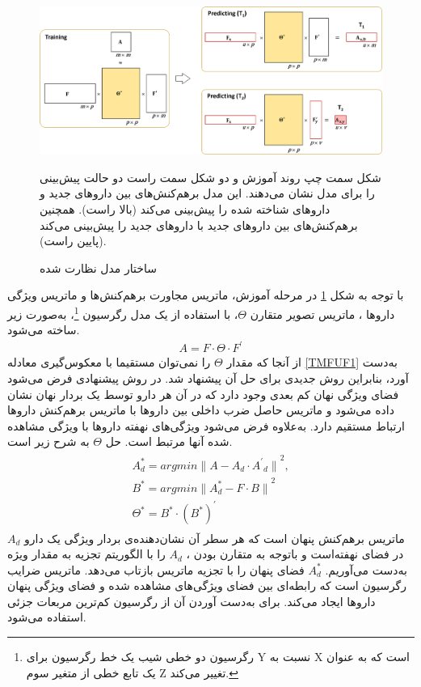\begin{figure}[!h]
\centering
\includegraphics[scale=.3]{section2/TMFUFmodel.png}
	\caption{
ساختار مدل نظارت شده 
\cite{Shi J-Y2018}}
\begin{flushright}
شکل سمت چپ روند آموزش و دو شکل سمت راست دو حالت پیش‌بینی را برای مدل
نشان می‌دهند. این مدل برهم‌کنش‌های بین داروهای جدید و داروهای شناخته شده را پیش‌بینی می‌کند (بالا راست). همچنین برهم‌کنش‌های بین داروهای جدید با داروهای جدید را پیش‌بینی می‌کند (پایین راست).
\end{flushright}

\label{TMFUFmodel}
\end{figure}
با توجه به شکل 
\ref{TMFUFmodel}
در مرحله آموزش، ماتریس مجاورت برهم‌کنش‌ها
و ماتریس ویژگی داروها
،
ماتریس تصویر متقارن
$\Theta$،
با استفاده از یک مدل رگرسیون 
\footnote{رگرسیون دو خطی شیب یک خط رگرسیون برای Y نسبت به X است که به عنوان یک تابع خطی از متغیر سوم Z تغییر می‌کند.}،
به‌صورت زیر ساخته می‌شود.
\begin{equation}
\begin{aligned}
A = F\cdot\Theta\cdot{F^\prime}
\label{TMFUF1}
\end{aligned}
\end{equation}
از آنجا که مقدار 
$\Theta$
را نمی‌توان مستقیما با معکوس‌گیری معادله
\ref{TMFUF1}
به‌دست آورد، بنابراین روش جدیدی برای حل آن پیشنهاد شد. در روش پیشنهادی فرض می‌شود فضای ویژگی نهان کم بعدی وجود دارد که در آن هر دارو توسط یک بردار نهان نشان داده می‌شود و ماتریس حاصل ضرب داخلی بین داروها با ماتریس برهم‌کنش داروها ارتباط مستقیم دارد. به‌علاوه فرض می‌شود ویژگی‌های نهفته داروها با ویژگی مشاهده شده آنها مرتبط است. حل
$\Theta$
به شرح زیر است.
\begin{equation}
\begin{aligned}
\begin{split}
A^*_d= arg min{\parallel{A-{A_d\cdot{A^\prime}_d}\parallel}^2}, 
\\
B^* = arg min{\parallel{{A^*_d} - {F \cdot B}\parallel}^2}
\\
\Theta ^* = B^*\cdot ( B^*) ^ \prime
\end{split}
\end{aligned}
\end{equation}
$A_d$
ماتریس برهم‌کنش پنهان است که هر سطر آن نشان‌دهنده‌ی بردار ویژگی یک دارو در فضای نهفته‌است و باتوجه به متقارن بودن 
، $A_d$
را با الگوریتم تجزیه به مقدار ویژه به‌دست می‌آوریم. 
$A^*_d$
فضای پنهان را با تجزیه ماتریس بازتاب می‌دهد. 
ماتریس ضرایب رگرسیون است که رابطه‌ای بین فضای ویژگی‌های مشاهده شده و فضای ویژگی پنهان داروها ایجاد می‌کند. برای به‌دست آوردن آن از رگرسیون کم‌ترین مربعات جزئی استفاده می‌شود. 

